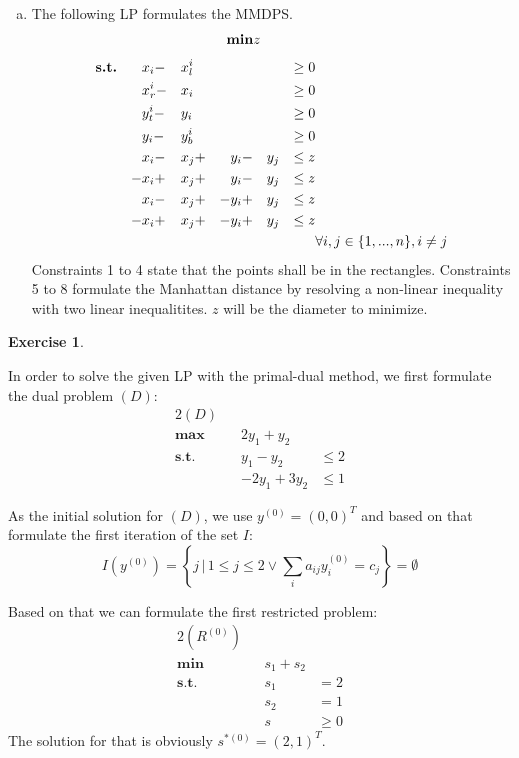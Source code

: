 \documentclass[a4paper,12pt,headsepline]{scrartcl}
\newtheorem{aufgabe}{Exercise}
\begin{document}
\begin{enumerate}[a)]
\item The following LP formulates the MMDPS. 
\begin{align*}
	\textbf{\text{min}} & z && && & &
\end{align*}
\begin{align}
	\textbf{\text{s.t.}} & &&x_i - &&x_l^i&&&& &\geq 0&\\
	                     & &&x_r^i - &&x_i&&&& &\geq 0&\\
	                     & &&y_t^i - &&y_i&&&& &\geq 0&\\
	                     & &&y_i - && y_b^i &&&& &\geq 0 &\\
	                     & && x_i - &&x_j + &&y_i - &&y_j &\leq z&\\
	                     & & -&x_i + &&x_j + &&y_i - &&y_j &\leq z&\\
	                     & && x_i - &&x_j + &-&y_i + &&y_j &\leq z&\\
	                     & & -&x_i + &&x_j + &-&y_i + &&y_j &\leq z&\\
	                     &&&&&&&&&&&\forall i,j\in \{1,...,n\}, i\neq j
\end{align}
Constraints 1 to 4 state that the points shall be in the rectangles. Constraints 5 to 8 formulate the Manhattan distance by resolving a non-linear inequality with two linear inequalitites. $z$ will be the diameter to minimize.
\end{enumerate}

\newpage
\begin{aufgabe}
\end{aufgabe}
In order to solve the given LP with the primal-dual method, we first formulate the dual problem $(D)$:
\begin{alignat*}{2}
	(D) \\
	\textbf{max}\quad  && 2y_1 + y_2 \\
	\textbf{s.t.}\quad && y_1 - y_2 &\le 2 \\
								     && -2y_1 + 3y_2 &\le 1
\end{alignat*}

As the initial solution for $(D)$, we use $y^{(0)}=(0,0)^T$ and based on that formulate the first iteration of the set $I$:
\[ I\left(y^{(0)}\right) = \left\{ j\,|\,1\le j\le 2 \vee \sum_i a_{ij}y^{(0)}_i=c_j \right\} = \emptyset \]

Based on that we can formulate the first restricted problem:
\begin{alignat*}{2}
	(R^{(0)}) \\
	\textbf{min}\quad  && s_1 + s_2 \\
	\textbf{s.t.}\quad && s_1 &= 2 \\
								     && s_2 &= 1 \\
								     && s &\ge 0
\end{alignat*}
The solution for that is obviously $s^{*(0)} = (2,1)^T$.
\end{document}
